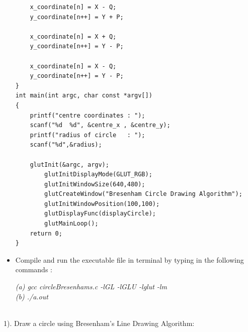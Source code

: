 \begin{itemize}
\begin{lstlisting}
	x_coordinate[n] = X - Q; 
	y_coordinate[n++] = Y + P;

	x_coordinate[n] = X + Q; 
	y_coordinate[n++] = Y - P;

	x_coordinate[n] = X - Q;
	y_coordinate[n++] = Y - P;
}
int main(int argc, char const *argv[])
{
	printf("centre coordinates : ");
	scanf("%d  %d", &centre_x , &centre_y);
	printf("radius of circle   : ");
	scanf("%d",&radius);

	glutInit(&argc, argv);
        glutInitDisplayMode(GLUT_RGB);
        glutInitWindowSize(640,480);
        glutCreateWindow("Bresenham Circle Drawing Algorithm");
        glutInitWindowPosition(100,100);
        glutDisplayFunc(displayCircle);
        glutMainLoop();
	return 0;
}
\end{lstlisting}

\vspace{0.5mm}

\item Compile and run the executable file in terminal by typing in the following commands : \\

\vspace{0.5mm} \flushleft

\textit{(a)\hspace{2mm} gcc circleBresenhams.c -lGL -lGLU -lglut -lm} \\
\textit{(b)\hspace{2mm} ./a.out}
\vspace*{1\baselineskip} 
\end{itemize}

\\

1). Draw a circle using Bresenham’s Line Drawing Algorithm:

